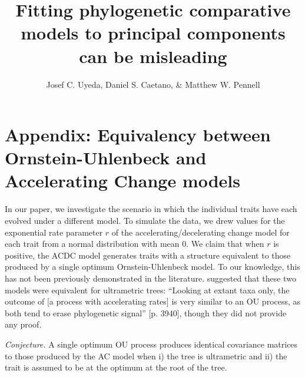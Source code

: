 \documentclass[12pt,twoside]{article}
\title{Fitting phylogenetic comparative models to principal components can be misleading}
\author{Josef C. Uyeda, Daniel S. Caetano, \& Matthew W. Pennell}
\date{}
\begin{document}
\maketitle

\section{Appendix: Equivalency between Ornstein-Uhlenbeck and Accelerating Change models}

In our paper, we investigate the scenario in which the individual traits have each evolved under a different model. To simulate the data, we drew values for the exponential rate parameter $r$ of the accelerating/decelerating change \citep[ACDC;][]{Blomberg2003} model for each trait from a normal distribution with mean 0. We claim that when $r$ is positive, the ACDC model generates traits with a structure equivalent to those produced by a single optimum Ornstein-Uhlenbeck \citep[OU;][]{Hansen1997} model. To our knowledge, this has not been previously demonstrated in the literature. \citet{SlaterFossil} suggested that these two models were equivalent for ultrametric trees: ``Looking at extant taxa only, the outcome of [a process with accelerating rates] is very similar to an OU process, as both tend to erase phylogenetic signal'' [p. 3940], though they did not provide any proof.\bigskip

\noindent \emph{Conjecture.} A single optimum OU process produces identical covariance matrices to those produced by the AC model when i) the tree is ultrametric and ii) the trait is assumed to be at the optimum at the root of the tree.
\end{document}
